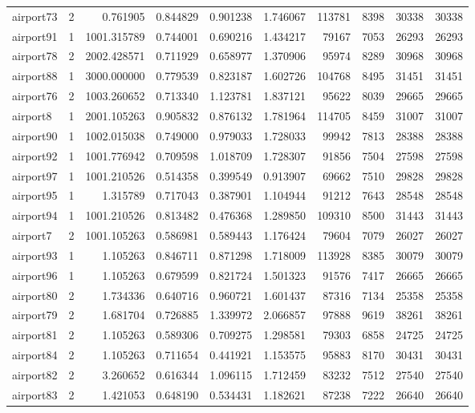 \begin{longtable}{|l|r|r|r|r|r|r|r|r|r|}
airport73 & 2 & 0.761905 & 0.844829 & 0.901238 & 1.746067 & 113781 & 8398 & 30338 & 30338 \\
airport91 & 1 & 1001.315789 & 0.744001 & 0.690216 & 1.434217 & 79167 & 7053 & 26293 & 26293 \\
airport78 & 2 & 2002.428571 & 0.711929 & 0.658977 & 1.370906 & 95974 & 8289 & 30968 & 30968 \\
airport88 & 1 & 3000.000000 & 0.779539 & 0.823187 & 1.602726 & 104768 & 8495 & 31451 & 31451 \\
airport76 & 2 & 1003.260652 & 0.713340 & 1.123781 & 1.837121 & 95622 & 8039 & 29665 & 29665 \\
airport8 & 1 & 2001.105263 & 0.905832 & 0.876132 & 1.781964 & 114705 & 8459 & 31007 & 31007 \\
airport90 & 1 & 1002.015038 & 0.749000 & 0.979033 & 1.728033 & 99942 & 7813 & 28388 & 28388 \\
airport92 & 1 & 1001.776942 & 0.709598 & 1.018709 & 1.728307 & 91856 & 7504 & 27598 & 27598 \\
airport97 & 1 & 1001.210526 & 0.514358 & 0.399549 & 0.913907 & 69662 & 7510 & 29828 & 29828 \\
airport95 & 1 & 1.315789 & 0.717043 & 0.387901 & 1.104944 & 91212 & 7643 & 28548 & 28548 \\
airport94 & 1 & 1001.210526 & 0.813482 & 0.476368 & 1.289850 & 109310 & 8500 & 31443 & 31443 \\
airport7 & 2 & 1001.105263 & 0.586981 & 0.589443 & 1.176424 & 79604 & 7079 & 26027 & 26027 \\
airport93 & 1 & 1.105263 & 0.846711 & 0.871298 & 1.718009 & 113928 & 8385 & 30079 & 30079 \\
airport96 & 1 & 1.105263 & 0.679599 & 0.821724 & 1.501323 & 91576 & 7417 & 26665 & 26665 \\
airport80 & 2 & 1.734336 & 0.640716 & 0.960721 & 1.601437 & 87316 & 7134 & 25358 & 25358 \\
airport79 & 2 & 1.681704 & 0.726885 & 1.339972 & 2.066857 & 97888 & 9619 & 38261 & 38261 \\
airport81 & 2 & 1.105263 & 0.589306 & 0.709275 & 1.298581 & 79303 & 6858 & 24725 & 24725 \\
airport84 & 2 & 1.105263 & 0.711654 & 0.441921 & 1.153575 & 95883 & 8170 & 30431 & 30431 \\
airport82 & 2 & 3.260652 & 0.616344 & 1.096115 & 1.712459 & 83232 & 7512 & 27540 & 27540 \\
airport83 & 2 & 1.421053 & 0.648190 & 0.534431 & 1.182621 & 87238 & 7222 & 26640 & 26640 \\

\end{longtable}
